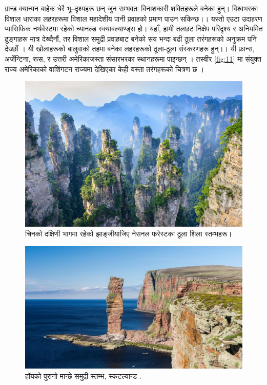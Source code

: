 \documentclass[10pt,twocolumn,letterpaper]{article}
\begin{document}
ग्रान्ड क्यान्यन बाहेक धेरै भू–दृश्यहरू छन् जुन सम्भवतः विनाशकारी शक्तिहरूले बनेका हुन्। विश्वभरका विशाल धाराका लहरहरूमा विशाल महादेशीय पानी प्रवाहको प्रमाण पाउन सकिन्छ।। यस्तो एउटा उदाहरण प्यासिफिक नर्थवेस्टमा रहेको च्यानल्ड स्क्याबल्याण्ड्स हो। यहाँ, हामी तलछट निक्षेप परिदृश्य र अनियमित ढुङ्गाहरू मात्र देख्दैनौं, तर विशाल समुद्री प्रवाहबाट बनेको सय भन्दा बढी ठूला तरंगहरूको अनुक्रम पनि देख्छौं \cite{78,79}। यी खोलाहरूको बालुवाको तहमा बनेका लहरहरूको ठूला-ठूला संस्करणहरू हुन्।। यी फ्रान्स, अर्जेन्टिना, रूस, र उत्तरी अमेरिकाजस्ता संसारभरका स्थानहरूमा पाइन्छन् \cite{81}। तस्वीर \ref{fig:11} मा संयुक्त राज्य अमेरिकाको वाशिंगटन राज्यमा देखिएका केही यस्ता तरंगहरूको चित्रण छ \cite{80}।

\begin{figure}[b]
\begin{center}

   \includegraphics[width=1\linewidth]{zhangjiajie.jpg}
\end{center}
   \caption{चिनको दक्षिणी भागमा रहेको झाङ्जीयाजिए नेसनल फरेस्टका ठूला शिला स्तम्भहरू।}
\label{fig:12}
\label{fig:onecol}
\end{figure}

\begin{figure}[b]
\begin{center}

   \includegraphics[width=1\linewidth]{hoy.jpg}
\end{center}
   \caption{हॉयको पुरानो मान्छे समुद्री स्तम्भ, स्कटल्यान्ड \cite{83}.}
\label{fig:13}
\label{fig:onecol}
\end{figure}
\end{document}
